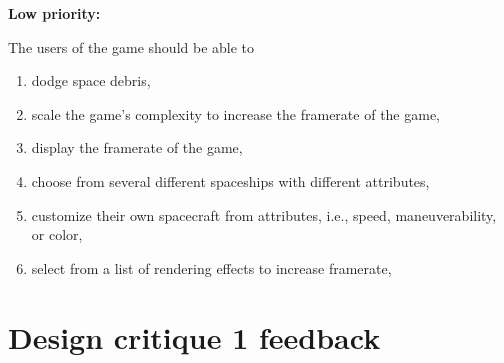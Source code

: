 \noindent \textbf{Low priority:}

The users of the game should be able to

\begin{enumerate}

  \item dodge space debris,

  \item scale the game's complexity to increase the framerate of the game,

  \item display the framerate of the game,

  \item choose from several different spaceships with different attributes,

  \item customize their own spacecraft from attributes, i.e., speed, maneuverability, or color,

  \item select from a list of rendering effects to increase framerate,

\end{enumerate}

\section*{Design critique 1 feedback}

